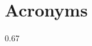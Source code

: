 \chapter*{Acronyms}

\begin{acronym}[OFDI]
{\setlength{\baselineskip}%
{0.67\baselineskip}



\par}
\end{acronym}